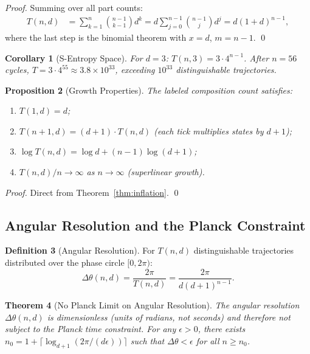 \documentclass[twocolumn,10pt,a4paper]{article}
\theoremstyle{thmstyle}
\newtheorem{theorem}{Theorem}[section]
\newtheorem{proposition}[theorem]{Proposition}
\newtheorem{corollary}[theorem]{Corollary}
\theoremstyle{definition}
\newtheorem{definition}[theorem]{Definition}
\theoremstyle{remark}
\begin{document}
\begin{proof}
Summing over all part counts:
\begin{align}
T(n,d) &= \sum_{k=1}^{n}\binom{n-1}{k-1}d^k
= d\sum_{j=0}^{n-1}\binom{n-1}{j}d^{j}
= d(1+d)^{n-1},
\end{align}
where the last step is the binomial theorem with $x = d$, $m = n-1$. \qed
\end{proof}

\begin{corollary}[S-Entropy Space]
For $d = 3$: $T(n,3) = 3 \cdot 4^{n-1}$. After $n = 56$ cycles, $T
= 3 \cdot 4^{55} \approx 3.8 \times 10^{33}$, exceeding $10^{33}$
distinguishable trajectories.
\end{corollary}

\begin{proposition}[Growth Properties]
\label{prop:growth}
The labeled composition count satisfies:
\begin{enumerate}[nosep,label=(\roman*)]
\item $T(1,d) = d$;
\item $T(n+1,d) = (d+1)\cdot T(n,d)$ (each tick multiplies states by $d+1$);
\item $\log T(n,d) = \log d + (n-1)\log(d+1)$;
\item $T(n,d)/n \to \infty$ as $n \to \infty$ (superlinear growth).
\end{enumerate}
\end{proposition}

\begin{proof}
Direct from Theorem~\ref{thm:inflation}. \qed
\end{proof}

\subsection{Angular Resolution and the Planck Constraint}

\begin{definition}[Angular Resolution]
For $T(n,d)$ distinguishable trajectories distributed over the phase
circle $[0,2\pi)$:
\[
\Delta\theta(n,d) = \frac{2\pi}{T(n,d)} = \frac{2\pi}{d(d+1)^{n-1}}.
\]
\end{definition}

\begin{theorem}[No Planck Limit on Angular Resolution]
\label{thm:no-planck}
The angular resolution $\Delta\theta(n,d)$ is dimensionless (units of
radians, not seconds) and therefore not subject to the Planck time
constraint. For any $\epsilon > 0$, there exists $n_0 = 1 +
\lceil\log_{d+1}(2\pi/(d\epsilon))\rceil$ such that $\Delta\theta <
\epsilon$ for all $n \geq n_0$.
\end{theorem}
\end{document}
